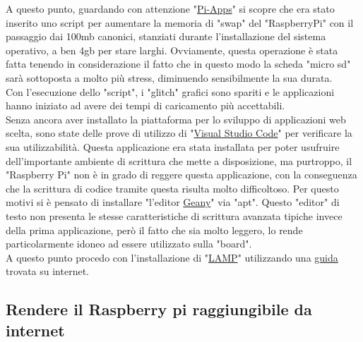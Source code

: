 A questo punto, guardando con attenzione "\href{https://pi-apps.io/}{Pi-Apps}" si scopre che era stato inserito uno script per aumentare la memoria di "swap" del "RaspberryPi" con il passaggio dai 100mb canonici, stanziati durante l'installazione del sistema operativo, a ben 4gb per stare larghi. Ovviamente, questa operazione è stata fatta tenendo in considerazione il fatto che in questo modo la scheda "micro sd" sarà sottoposta a molto più stress, diminuendo sensibilmente la sua durata.\\
Con l'esecuzione dello "script", i "glitch" grafici sono spariti e le applicazioni hanno iniziato ad avere dei tempi di caricamento più accettabili.\\
Senza ancora aver installato la piattaforma per lo sviluppo di applicazioni web scelta, sono state delle prove di utilizzo di "\href{https://code.visualstudio.com/}{Visual Studio Code}" per verificare la sua utilizzabilità. Questa applicazione era stata installata per poter usufruire dell'importante ambiente di scrittura che mette a disposizione, ma purtroppo, il "Raspberry Pi" non è in grado di reggere questa applicazione, con la conseguenza che la scrittura di codice tramite questa risulta molto difficoltoso. Per questo motivi si è pensato di installare "l'editor \href{https://www.geany.org/}{Geany}" via "apt". Questo "editor" di testo non presenta le stesse caratteristiche di scrittura avanzata tipiche invece della prima applicazione, però il fatto che sia molto leggero, lo rende particolarmente idoneo ad essere utilizzato sulla "board".\\
A questo punto procedo con l'installazione di "\href{https://it.wikipedia.org/wiki/LAMP}{LAMP}" utilizzando una \href{https://randomnerdtutorials.com/raspberry-pi-apache-mysql-php-lamp-server/}{guida} trovata su internet. 

\subsection{Rendere il Raspberry pi raggiungibile da internet}